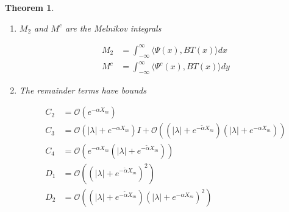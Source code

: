 \documentclass[12pt]{article}
\newtheorem{theorem}{Theorem}
\begin{document}
\begin{theorem}
\begin{enumerate}
\begin{align*}
A &= \begin{pmatrix}
-a_0 + \tilde{a}_1 & a_0 - \tilde{a}_1 \\
-\tilde{a}_0 + a_1 & \tilde{a}_0 - a_1
\end{pmatrix} && n = 2 \\
A &= \begin{pmatrix}
\tilde{a}_{n-1} - a_0 & a_0 & & & \dots & -\tilde{a}_{n-1}\\
-\tilde{a}_0 & \tilde{a}_0 - a_1 &  a_1 \\
& -\tilde{a}_1 & \tilde{a}_1 - a_2 &  a_2 \\
& & \vdots & & \vdots \\
a_{n-1} & & & & -\tilde{a}_{n-2} & \tilde{a}_{n-2} - a_{n-1} \\
\end{pmatrix} && n > 2
\end{align*}

where

\begin{align*}
a_i &= \langle \Psi(X_i), Q'(-X_i) \rangle \\
\tilde{a}_i &= \langle \Psi(-X_i), Q'(X_i) \rangle
\end{align*}

\item $M_2$ and $M^c$ are the Melnikov integrals

\begin{align*}
M_2 &= \int_{-\infty}^\infty \langle \Psi(x), B T(x) \rangle dx \\
M^c &= \int_{-\infty}^\infty \langle \Psi^c(x), B T(x) \rangle dy
\end{align*}

\item The remainder terms have bounds

\begin{align*}
C_2 &= \mathcal{O}(e^{-\alpha X_m}) \\
C_3 &= \mathcal{O}(|\lambda| + e^{-\alpha X_m}) I
+ \mathcal{O}((|\lambda| + e^{-\tilde{\alpha} X_m})( |\lambda| + e^{-\alpha X_m}))\\
C_4 &= \mathcal{O}(e^{-\alpha X_m}(|\lambda| + e^{-\tilde{\alpha} X_m})) \\
D_1 &= \mathcal{O}((|\lambda| + e^{-\tilde{\alpha} X_m})^2) \\
D_2 &= \mathcal{O}((|\lambda| + e^{-\tilde{\alpha} X_m})(|\lambda| + e^{-\alpha X_m})^2) 
\end{align*}


\end{enumerate}
\end{theorem}
\end{document}
